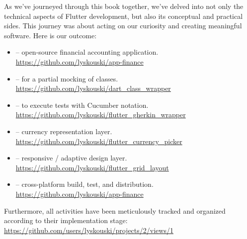 
As we've journeyed through this book together, we've delved into not only the technical aspects of Flutter development, 
but also its conceptual and practical sides. This journey was about acting on our curiosity and creating meaningful 
software. Here is our outcome:

\begin{itemize}
\item {} -- open-source financial accounting application.\\
\href{https://github.com/lyskouski/app-finance}{https://github.com/lyskouski/app-finance}

\item {} -- for a partial mocking of classes.\\
\href{https://github.com/lyskouski/dart\_class\_wrapper}{https://github.com/lyskouski/dart\_class\_wrapper}

\item {} -- to execute tests with Cucumber notation.\\
\href{https://github.com/lyskouski/flutter\_gherkin\_wrapper}{https://github.com/lyskouski/flutter\_gherkin\_wrapper}

\item {} -- currency representation layer.\\
\href{https://github.com/lyskouski/flutter\_currency\_picker}{https://github.com/lyskouski/flutter\_currency\_picker}

\item {} -- responsive / adaptive design layer.\\
\href{https://github.com/lyskouski/flutter\_grid\_layout}{https://github.com/lyskouski/flutter\_grid\_layout}

\item {} -- cross-platform build, test, and distribution.\\
\href{https://github.com/lyskouski/app-finance/tree/main/.github/workflows}{https://github.com/lyskouski/app-finance}

\end{itemize}

\noindent Furthermore, all activities have been meticulously tracked and organized according to their implementation 
stage: \href{https://github.com/users/lyskouski/projects/2/views/1}{https://github.com/users/lyskouski/projects/2/views/1}
